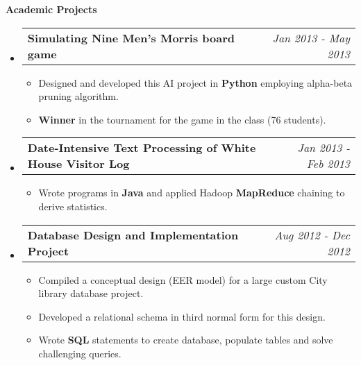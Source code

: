 \documentclass[letterpaper,11pt]{article}
\makeatletter
\newcommand{\resitem}[1]{\item[\ding{226}] #1 \vspace{-2pt}}
\newcommand{\resheading}[1]{{\large \colorbox{mygrey}{\begin{minipage}{\textwidth}{\textbf{#1 \vphantom{p\^{E}}}}\end{minipage}}}}
\newcommand{\ressubheading}[4]{
\begin{tabular*}{7.0in}{l@{\extracolsep{\fill}}r}
		\textbf{#1} & #2 \\
		\textit{#3} & \textit{#4} \\
\end{tabular*}\vspace{-6pt}}
\newcommand{\reslineheading}[2]{
\begin{tabular*}{7.0in}{l@{\extracolsep{\fill}}r}
		\textbf{#1} & #2 \\
\end{tabular*}\vspace{-6pt}}
\makeatother
\begin{document}
\resheading{Academic Projects}
\begin{itemize}


\item
	\reslineheading{Simulating Nine Men's Morris board game}{\textit{Jan 2013 - May 2013}}
	\begin{itemize}
		\resitem{Designed and developed this AI project in \textbf{Python} employing alpha-beta pruning algorithm.}
		\resitem{\textbf{Winner} in the tournament for the game in the class (76 students).}
	\end{itemize}

\item
	\reslineheading{Date-Intensive Text Processing of White House Visitor Log}{\textit{Jan 2013 - Feb 2013}}
	\begin{itemize}
		\resitem{Wrote programs in \textbf{Java} and applied Hadoop \textbf{MapReduce} chaining to derive statistics.}%
	\end{itemize}

\item
	\reslineheading{Database Design and Implementation Project}{\textit{Aug 2012 - Dec 2012}}
	\begin{itemize}
		\resitem{Compiled a conceptual design (EER model) for a large custom City library database project.}
		\resitem{Developed a relational schema in third normal form for this design.}
        \resitem{Wrote \textbf{SQL} statements to create database, populate tables and solve challenging queries.}
	\end{itemize}


\end{itemize}
\end{document}
